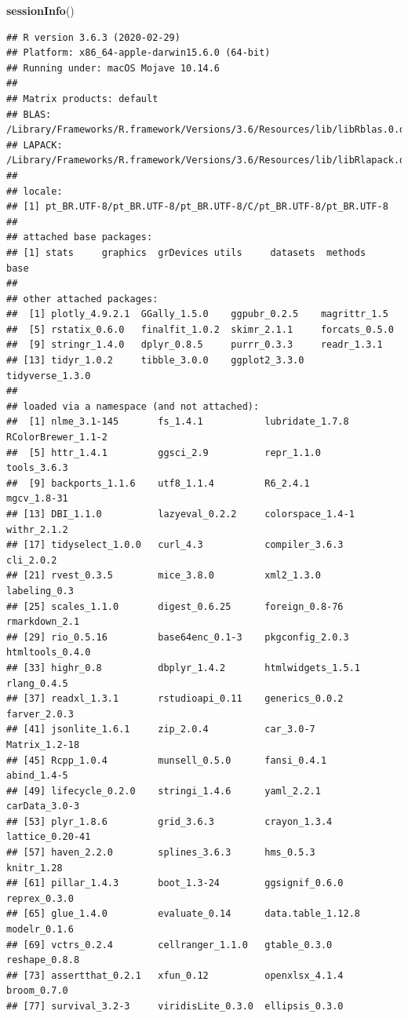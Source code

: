 \documentclass[]{article}
\newenvironment{Shaded}{\begin{snugshade}}{\end{snugshade}}
\newcommand{\KeywordTok}[1]{\textcolor[rgb]{0.13,0.29,0.53}{\textbf{#1}}}
\newcommand{\NormalTok}[1]{#1}
\begin{document}
\begin{Shaded}
\begin{Highlighting}[]
\KeywordTok{sessionInfo}\NormalTok{()}
\end{Highlighting}
\end{Shaded}

\begin{verbatim}
## R version 3.6.3 (2020-02-29)
## Platform: x86_64-apple-darwin15.6.0 (64-bit)
## Running under: macOS Mojave 10.14.6
## 
## Matrix products: default
## BLAS:   /Library/Frameworks/R.framework/Versions/3.6/Resources/lib/libRblas.0.dylib
## LAPACK: /Library/Frameworks/R.framework/Versions/3.6/Resources/lib/libRlapack.dylib
## 
## locale:
## [1] pt_BR.UTF-8/pt_BR.UTF-8/pt_BR.UTF-8/C/pt_BR.UTF-8/pt_BR.UTF-8
## 
## attached base packages:
## [1] stats     graphics  grDevices utils     datasets  methods   base     
## 
## other attached packages:
##  [1] plotly_4.9.2.1  GGally_1.5.0    ggpubr_0.2.5    magrittr_1.5   
##  [5] rstatix_0.6.0   finalfit_1.0.2  skimr_2.1.1     forcats_0.5.0  
##  [9] stringr_1.4.0   dplyr_0.8.5     purrr_0.3.3     readr_1.3.1    
## [13] tidyr_1.0.2     tibble_3.0.0    ggplot2_3.3.0   tidyverse_1.3.0
## 
## loaded via a namespace (and not attached):
##  [1] nlme_3.1-145       fs_1.4.1           lubridate_1.7.8    RColorBrewer_1.1-2
##  [5] httr_1.4.1         ggsci_2.9          repr_1.1.0         tools_3.6.3       
##  [9] backports_1.1.6    utf8_1.1.4         R6_2.4.1           mgcv_1.8-31       
## [13] DBI_1.1.0          lazyeval_0.2.2     colorspace_1.4-1   withr_2.1.2       
## [17] tidyselect_1.0.0   curl_4.3           compiler_3.6.3     cli_2.0.2         
## [21] rvest_0.3.5        mice_3.8.0         xml2_1.3.0         labeling_0.3      
## [25] scales_1.1.0       digest_0.6.25      foreign_0.8-76     rmarkdown_2.1     
## [29] rio_0.5.16         base64enc_0.1-3    pkgconfig_2.0.3    htmltools_0.4.0   
## [33] highr_0.8          dbplyr_1.4.2       htmlwidgets_1.5.1  rlang_0.4.5       
## [37] readxl_1.3.1       rstudioapi_0.11    generics_0.0.2     farver_2.0.3      
## [41] jsonlite_1.6.1     zip_2.0.4          car_3.0-7          Matrix_1.2-18     
## [45] Rcpp_1.0.4         munsell_0.5.0      fansi_0.4.1        abind_1.4-5       
## [49] lifecycle_0.2.0    stringi_1.4.6      yaml_2.2.1         carData_3.0-3     
## [53] plyr_1.8.6         grid_3.6.3         crayon_1.3.4       lattice_0.20-41   
## [57] haven_2.2.0        splines_3.6.3      hms_0.5.3          knitr_1.28        
## [61] pillar_1.4.3       boot_1.3-24        ggsignif_0.6.0     reprex_0.3.0      
## [65] glue_1.4.0         evaluate_0.14      data.table_1.12.8  modelr_0.1.6      
## [69] vctrs_0.2.4        cellranger_1.1.0   gtable_0.3.0       reshape_0.8.8     
## [73] assertthat_0.2.1   xfun_0.12          openxlsx_4.1.4     broom_0.7.0       
## [77] survival_3.2-3     viridisLite_0.3.0  ellipsis_0.3.0
\end{verbatim}
\end{document}
